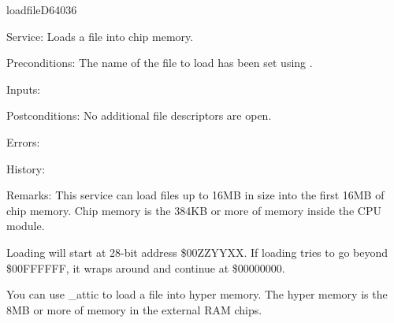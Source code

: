 \newpage
\begin{hyppotrap}{loadfile}{D640}{36}
\item [Service:]
  Loads a file into chip memory.
\item [Preconditions:]
  The name of the file to load has been set using .
\item [Inputs:]
\item [Postconditions:]
  No additional file descriptors are open.
\item [Errors:]
\item [History:]
\item [Remarks:]
  This service can load files up to 16MB in size into the first 16MB of chip
  memory. Chip memory is the 384KB or more of memory inside the CPU module.

  Loading will start at 28-bit address \$00ZZYYXX. If loading tries to go beyond
  \$00FFFFFF, it wraps around and continue at \$00000000.

  You can use \_attic to load a file into hyper memory. The
  hyper memory is the 8MB or more of memory in the external RAM chips.
\end{hyppotrap}


